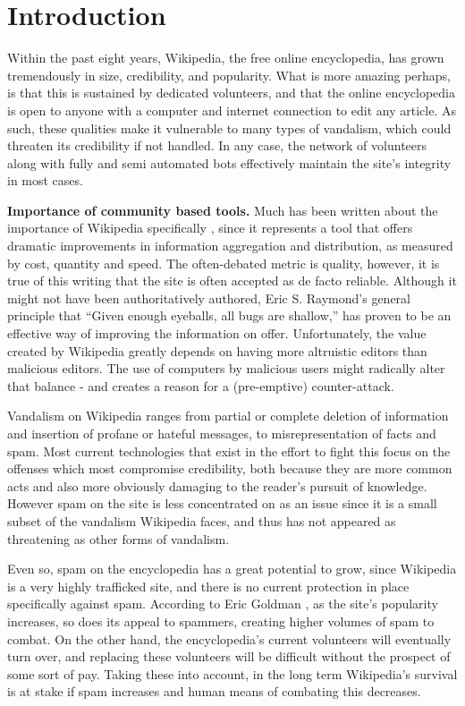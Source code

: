 \documentclass[letterpaper]{sig-alternate}
\begin{document}
\section{Introduction}
\label{sec:intro}
Within the past eight years, Wikipedia, the free online encyclopedia, has grown tremendously in size, credibility, and popularity. What is more amazing perhaps, is that this is sustained by dedicated volunteers, and that the online encyclopedia is open to anyone with a computer and internet connection to edit any article. As such, these qualities make it vulnerable to many types of vandalism, which could threaten its credibility if not handled. In any case, the network of volunteers along with fully and semi automated bots effectively maintain the site's integrity in most cases.

\textbf{Importance of community based tools.}  Much has been written about the importance of Wikipedia specifically \cite{puppy_smoothies}, since it represents a tool that offers dramatic improvements in information aggregation and distribution, as measured by cost, quantity and speed. The often-debated metric is quality, however, it is true of this writing that the site is often accepted as de facto reliable. Although it might not have been authoritatively authored, Eric S. Raymond's general principle that ``Given enough eyeballs, all bugs are shallow,'' has proven to be an effective way of improving the information on offer. Unfortunately, the value created by Wikipedia greatly depends on having more altruistic editors than malicious editors. The use of computers by malicious users might radically alter that balance - and creates a reason for a (pre-emptive) counter-attack. 

Vandalism on Wikipedia ranges from partial or complete deletion of information and insertion of profane or hateful messages, to misrepresentation of facts and spam. Most current technologies that exist in the effort to fight this focus on the offenses which most compromise credibility, both because they are more common acts and also more obviously damaging to the reader's pursuit of knowledge. However spam on the site is less concentrated on as an issue since it is a small subset of the vandalism Wikipedia faces, and thus has not appeared as threatening as other forms of vandalism. 

Even so, spam on the encyclopedia has a great potential to grow, since Wikipedia is a very highly trafficked site, and there is no current protection in place specifically against spam. According to Eric Goldman \cite{wiki_labor_squeeze}, as the site's popularity increases, so does its appeal to spammers, creating higher volumes of spam to combat. On the other hand, the encyclopedia's current volunteers will eventually turn over, and replacing these volunteers will be difficult without the prospect of some sort of pay. Taking these into account, in the long term Wikipedia's survival is at stake if spam increases and human means of combating this decreases.
\end{document}
